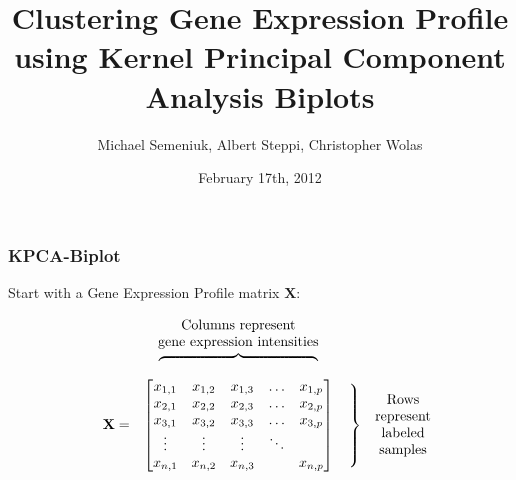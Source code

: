 \documentclass[serif ]{beamer}
\title{Clustering Gene Expression Profile using Kernel Principal Component Analysis Biplots}
\author{Michael Semeniuk, Albert Steppi, Christopher Wolas}
\date{February 17th, 2012}
\begin{document}
	\maketitle
	
	
	\begin{frame}
		\frametitle{KPCA-Biplot}
			Start with a Gene Expression Profile matrix $\mathbf{X}$:





			\begin{equation}			
			\begin{matrix}
			& & \text{Columns represent} & & \\
			& & \text{gene expression intensities} & & \\
			& & \rotatebox[origin=c]{270}{$\begin{cases} & \\  & \\ & \\ & \\ &  \\ & \\ &  \\  & \\ \end{cases}$} & & \\
			&\mathbf{X}=  
			&       \begin{bmatrix}
					x_{1,1} & x_{1,2} & x_{1,3} & \ldots  & x_{1,p} \\ 
					x_{2,1} & x_{2,2} & x_{2,3} & \ldots  & x_{2,p} \\ 
					x_{3,1} & x_{3,2} & x_{3,3} & \ldots  & x_{3,p} \\ 
					\vdots   & \vdots   & \vdots   & \ddots  &              \\ 
					x_{n,1} & x_{n,2} & x_{n,3} &            & x_{n,p} \\ 
				\end{bmatrix}
			&\left.\begin{matrix}\\ \\ \\ \\ \\  \end{matrix}\right\}
                                & \rotatebox[origin=c]{0}{$ \begin{matrix} 
						                    \text{Rows}        \\
							          \text{represent} \\ 
							          \text{labeled}     \\
							          \text{samples}    \\ 
                                                                               \end{matrix}$} \\


\end{matrix}
\end{equation}
\end{frame}
\end{document}
